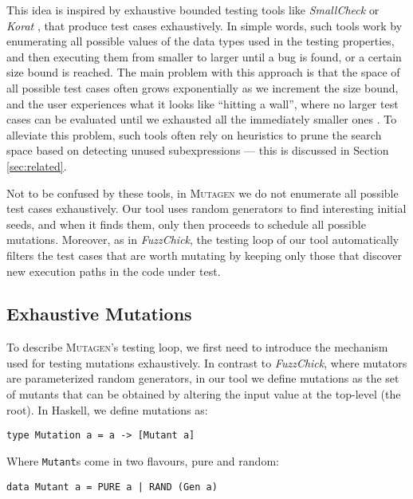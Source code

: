 \documentclass[acmsmall, anonymous]{acmart}
\newcommand{\fuzzchick}{\textit{FuzzChick}\xspace}
\newcommand{\mutagen}{\textsc{Mutagen}\xspace}
\begin{document}
This idea is inspired by exhaustive bounded testing tools like \emph{SmallCheck}
\cite{runciman2008smallcheck} or \emph{Korat} \cite{boyapati2002korat}, that
produce test cases exhaustively.
%
In simple words, such tools work by enumerating all possible values of the data
types used in the testing properties, and then executing them from smaller to
larger until a bug is found, or a certain size bound is reached.
%
The main problem with this approach is that the space of all possible test cases
often grows exponentially as we increment the size bound, and the user
experiences what it looks like ``hitting a wall'', where no larger test cases
can be evaluated until we exhausted all the immediately smaller ones
\cite{DuregardJW12}.
%
To alleviate this problem, such tools often rely on heuristics to prune the
search space based on detecting unused subexpressions --- this is discussed in
Section \ref{sec:related}.



Not to be confused by these tools, in \mutagen we do not enumerate all possible
test cases exhaustively.
%
Our tool uses random generators to find interesting initial seeds, and when it
finds them, only then proceeds to schedule all possible mutations.
%
Moreover, as in \fuzzchick, the testing loop of our tool automatically filters
the test cases that are worth mutating by keeping only those that discover new
execution paths in the code under test.


\subsection{Exhaustive Mutations}

To describe \mutagen's testing loop, we first need to introduce the mechanism
used for testing mutations exhaustively.
%
In contrast to \fuzzchick, where mutators are parameterized random generators,
in our tool we define mutations as the set of mutants that can be obtained by
altering the input value at the top-level (the root).
%
In Haskell, we define mutations as:

\begin{verbatim}
type Mutation a = a -> [Mutant a]
\end{verbatim}

\noindent Where \texttt{Mutant}s come in two flavours, pure and random:

\begin{verbatim}
data Mutant a = PURE a | RAND (Gen a)
\end{verbatim}
\end{document}
